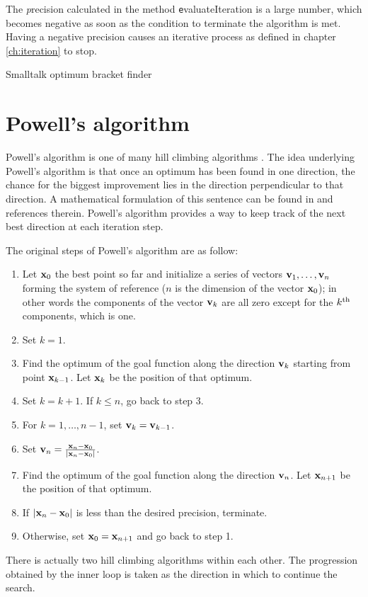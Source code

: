 The {\textsl precision} calculated in the method {\texttt
evaluateIteration} is a large number, which becomes negative as
soon as the condition to terminate the algorithm is met. Having a
negative precision causes an iterative process as defined in
chapter \ref{ch:iteration} to stop.

\begin{listing} Smalltalk optimum bracket finder \label{ls:optimizerbracket}

\end{listing}


\section{Powell's algorithm}
\label{sec:powell}Powell's algorithm is one of many hill climbing
algorithms \cite{Press}. The idea underlying Powell's algorithm is
that once an optimum has been found in one direction, the chance
for the biggest improvement lies in the direction perpendicular to
that direction. A mathematical formulation of this sentence can be
found in \cite{Press} and references therein. Powell's algorithm
provides a way to keep track of the next best direction at each
iteration step.

\noindent The original steps of Powell's algorithm are as follow:
\begin{enumerate}
  \item Let ${\textbf x}_0$ the best point so far and initialize a
  series of vectors ${\textbf v}_1,\ldots,{\textbf v}_n$ forming the system
  of reference ($n$ is the
  dimension of the vector ${\textbf x}_0$); in
  other words the components of the vector ${\textbf v}_k$ are all
  zero except for the $k^{\mathop{\textrm{th}}}$ components, which is one.
  \item Set $k=1$.
  \item Find the optimum of the goal function along the direction ${\textbf
  v}_k$ starting from point ${\textbf x}_{k-1}$. Let ${\textbf x}_k$  be
  the position of that optimum.
  \item Set $k=k+1$. If $k\leq n$, go back to step 3.
  \item For $k=1,\ldots,n-1$, set ${\textbf v}_k={\textbf v}_{k-1}$.
  \item Set ${\textbf v}_n ={ {\textbf x}_n-{\textbf x}_0 \over \left| {\textbf x}_n-{\textbf x}_0\right|}$.
  \item Find the optimum of the goal function along the direction ${\textbf
  v}_n$. Let ${\textbf x}_{n+1}$  be the position of that optimum.
  \item If $\left| {\textbf x}_n-{\textbf x}_0\right|$ is less than the
  desired precision, terminate.
  \item Otherwise, set ${\textbf x}_0={\textbf x}_{n+1}$ and go back to
  step 1.
\end{enumerate}
There is actually two hill climbing algorithms within each other.
The progression obtained by the inner loop is taken as the
direction in which to continue the search.

